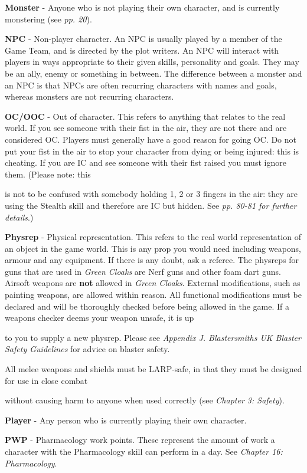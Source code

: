 \textbf{Monster} - Anyone who is not playing their own character, and is currently monstering (see \textit{pp. 20}).

\textbf{NPC} - Non-player character. An NPC is usually played by a member of the Game Team, and is directed by the plot writers. An NPC will interact with players in ways appropriate to their given skills, personality and goals. They may be an ally, enemy or something in between. The difference between a monster and an NPC is that NPCs are often recurring characters with names and goals, whereas monsters are not recurring characters.

\textbf{OC/OOC} - Out of character. This refers to anything that relates to the real world. If you see someone with their fist in the air, they are not there and are considered OC. Players must generally have a good reason for going OC. Do not put your fist in the air to stop your character from dying or being injured: this is cheating. If you are IC and see someone with their fist raised you must ignore them. (Please note: this

is not to be confused with somebody holding 1, 2 or 3 fingers in the air: they are using the Stealth skill and therefore are IC but hidden. See \textit{pp. 80-81 for further details}.)

\textbf{Physrep} - Physical representation. This refers to the real world representation of an object in the game world. This is any prop you would need including weapons, armour and any equipment. If there is any doubt, ask a referee. The physreps for guns that are used in \textit{Green Cloaks} are Nerf guns and other foam dart guns. Airsoft weapons are \textbf{not} allowed in \textit{Green Cloaks}. External modifications, such as painting weapons, are allowed within reason. All functional modifications must be declared and will be thoroughly checked before being allowed in the game. If a weapons checker deems your weapon unsafe, it is up

to you to supply a new physrep. Please see \textit{Appendix J. Blastersmiths UK Blaster Safety Guidelines} for advice on blaster safety.

All melee weapons and shields must be LARP-safe, in that they must be designed for use in close combat

without causing harm to anyone when used correctly (see \textit{Chapter 3: Safety}).

\textbf{Player} - Any person who is currently playing their own character.

\textbf{PWP} - Pharmacology work points. These represent the amount of work a character with the Pharmacology skill can perform in a day. See \textit{Chapter 16: Pharmacology}.

